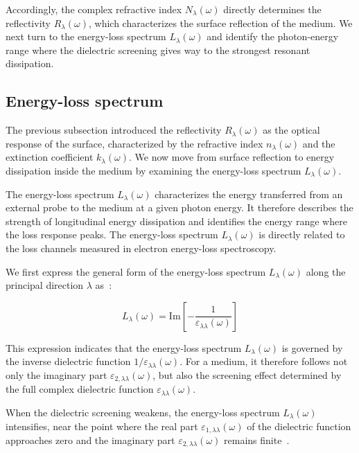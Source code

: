 Accordingly, the complex refractive index $N_{\lambda}(\omega)$ directly determines the reflectivity $R_{\lambda}(\omega)$,
which characterizes the surface reflection of the medium.
We next turn to the energy-loss spectrum $L_{\lambda}(\omega)$ and identify the photon-energy range where the dielectric screening gives way to the strongest resonant dissipation.

\subsection{Energy-loss spectrum}

The previous subsection introduced the reflectivity $R_{\lambda}(\omega)$ as the optical response of the surface,
characterized by the refractive index $n_{\lambda}(\omega)$ and the extinction coefficient $k_{\lambda}(\omega)$.
We now move from surface reflection to energy dissipation inside the medium by examining the energy-loss spectrum $L_{\lambda}(\omega)$.

The energy-loss spectrum $L_{\lambda}(\omega)$ characterizes the energy transferred from an external probe to the medium at a given photon energy.
It therefore describes the strength of longitudinal energy dissipation and identifies the energy range where the loss response peaks.
The energy-loss spectrum $L_{\lambda}(\omega)$ is directly related to the loss channels measured in electron energy-loss spectroscopy.

We first express the general form of the energy-loss spectrum $L_{\lambda}(\omega)$ along the principal direction $\lambda$ as~\cite{dressel2002electrodynamics,wooten2013optical,fox2010optical,onida2002electronic}:

\begin{equation}
    L_{\lambda}(\omega)=
    \mathrm{Im}\left[-\frac{1}{\varepsilon_{\lambda\lambda}(\omega)}\right]
\label{energy_loss_spectrum_from_inverse_dielectric_function}
\end{equation}

This expression indicates that the energy-loss spectrum $L_{\lambda}(\omega)$ is governed by the inverse dielectric function $1/\varepsilon_{\lambda\lambda}(\omega)$.
For a medium, it therefore follows not only the imaginary part $\varepsilon_{2,\lambda\lambda}(\omega)$,
but also the screening effect determined by the full complex dielectric function $\varepsilon_{\lambda\lambda}(\omega)$.

When the dielectric screening weakens,
the energy-loss spectrum $L_{\lambda}(\omega)$ intensifies,
near the point where the real part $\varepsilon_{1,\lambda\lambda}(\omega)$ of the dielectric function approaches zero and the imaginary part $\varepsilon_{2,\lambda\lambda}(\omega)$ remains finite~\cite{dressel2002electrodynamics,onida2002electronic,leon2026momentum}.

